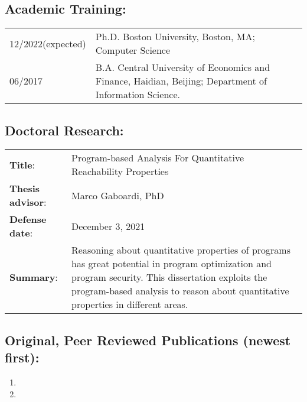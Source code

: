 \documentclass[12pt, letterpaper]{report}   %
\begin{document}
\subsection*{Academic Training:}
\begin{tabular}{p{}p{}}
12/2022\small(expected) &  Ph.D. Boston University, Boston, MA; Computer Science\\
06/2017  & B.A. Central University of Economics and Finance, Haidian, Beijing; Department of Information Science. \\
\end{tabular}

\subsection*{Doctoral Research:}
\begin{tabular}{p{}p{}}
\textbf{Title}: & Program-based Analysis For Quantitative Reachability Properties \\
\textbf{Thesis advisor}: & Marco Gaboardi, PhD\\
\textbf{Defense date}: & December 3, 2021 \\
\textbf{Summary}: & Reasoning about quantitative properties of programs has great potential in program optimization and program security. This dissertation exploits the program-based analysis to reason about quantitative properties in different areas.
\\
\end{tabular}

\subsection*{Original, Peer Reviewed Publications (newest first):}
\begin{enumerate}
\item 
\item 
\end{enumerate}
\end{document}
